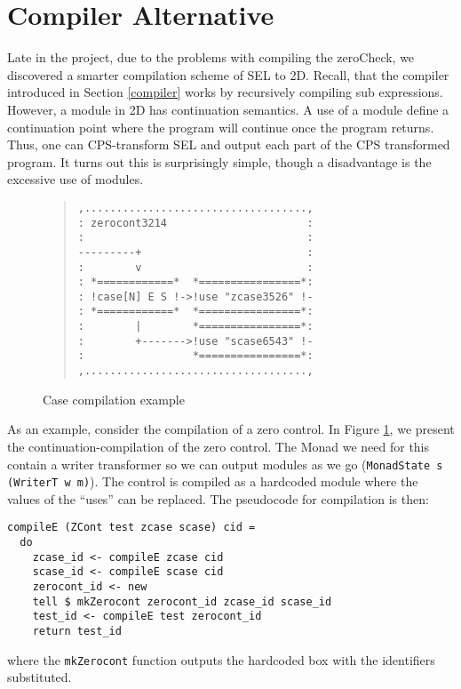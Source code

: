 \section{Compiler Alternative}
\label{chap:compiler-alter}

Late in the project, due to the problems with compiling the zeroCheck,
we discovered a smarter compilation scheme of SEL to 2D. Recall, that
the compiler introduced in Section \ref{compiler} works by recursively
compiling sub expressions. However, a module in 2D has continuation
semantics. A use of a module define a continuation point where the
program will continue once the program returns. Thus, one can
CPS-transform SEL and output each part of the CPS transformed
program. It turns out this is surprisingly simple, though a
disadvantage is the excessive use of modules.

\begin{figure}
  \begin{quote}
\begin{verbatim}
,...................................,
: zerocont3214                      :
:                                   :
---------+                          :
:        v                          :
: *============*  *================*:
: !case[N] E S !->!use "zcase3526" !-
: *============*  *================*:
:      	 |        *================*:
:        +------->!use "scase6543" !-
:                 *================*:
,...................................,
\end{verbatim}
  \end{quote}
  \caption{Case compilation example}
  \label{fig:2}
\end{figure}

As an example, consider the compilation of a zero control. In Figure
\ref{fig:2}, we present the continuation-compilation of the zero
control. The Monad we need for this contain a writer transformer so we
can output modules as we go (\texttt{MonadState s (WriterT w m)}). The
control is compiled as a hardcoded module where the values of the
``uses'' can be replaced. The pseudocode for compilation is then:

\begin{samepage}
\begin{verbatim}
compileE (ZCont test zcase scase) cid =
  do
    zcase_id <- compileE zcase cid
    scase_id <- compileE scase cid
    zerocont_id <- new
    tell $ mkZerocont zerocont_id zcase_id scase_id
    test_id <- compileE test zerocont_id
    return test_id
\end{verbatim}
\end{samepage}
where the \texttt{mkZerocont} function outputs the hardcoded box with
the identifiers substituted.

